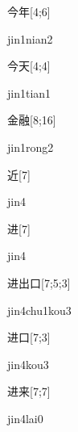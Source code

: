 \begin{verbete}{今年}[4;6]
\begin{pronuncia}{jin1nian2}
\end{pronuncia}
\end{verbete}

\begin{verbete}{今天}[4;4]
\begin{pronuncia}{jin1tian1}
\end{pronuncia}
\end{verbete}

\begin{verbete}{金融}[8;16]
\begin{pronuncia}{jin1rong2}
\end{pronuncia}
\end{verbete}

\begin{verbete}[jin4]{近}[7]
\begin{pronuncia}{jin4}
\end{pronuncia}
\end{verbete}

\begin{verbete}[jin4]{进}[7]
\begin{pronuncia}{jin4}
\end{pronuncia}
\end{verbete}

\begin{verbete}{进出口}[7;5;3]
\begin{pronuncia}{jin4chu1kou3}
\end{pronuncia}
\end{verbete}

\begin{verbete}{进口}[7;3]
\begin{pronuncia}{jin4kou3}
\end{pronuncia}
\end{verbete}

\begin{verbete}{进来}[7;7]
\begin{pronuncia}{jin4lai0}
\end{pronuncia}
\end{verbete}

